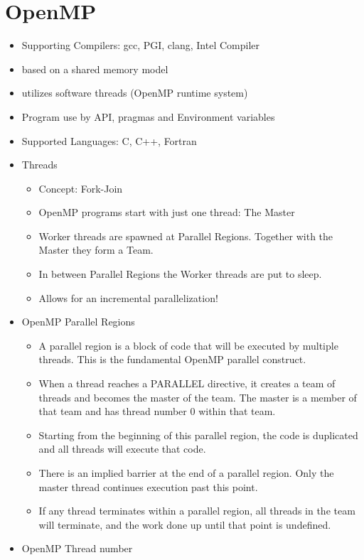 \documentclass[paper=a4, fontsize=11pt]{scrartcl} %
\numberwithin{equation}{section} %
\numberwithin{figure}{section} %
\numberwithin{table}{section} %
\begin{document}
\section{OpenMP}

\begin{itemize}
  \item Supporting Compilers: gcc, PGI, clang, Intel Compiler
  \item based on a shared memory model
  \item utilizes software threads (OpenMP runtime system)
  \item Program use by API, pragmas and Environment variables
  \item Supported Languages: C, C++, Fortran
  \item Threads
  \begin{itemize}
    \item Concept: Fork-Join
    \item OpenMP programs start with just one thread: The Master
    \item Worker threads are spawned at Parallel Regions. Together with the Master they form a Team.
    \item In between Parallel Regions the Worker threads are put to sleep.
    \item Allows for an incremental parallelization!
  \end{itemize}
  \item OpenMP Parallel Regions
  \begin{itemize}
    \item A parallel region is a block of code that will be executed by multiple threads. This is the fundamental OpenMP parallel construct.
    \item When a thread reaches a PARALLEL directive, it creates a team of threads and becomes the master of the team. The master is a member of that team and has thread number 0 within that team.
    \item Starting from the beginning of this parallel region, the code is duplicated and all threads will execute that code.
    \item There is an implied barrier at the end of a parallel region. Only the master thread continues execution past this point.
    \item If any thread terminates within a parallel region, all threads in the team will terminate, and the work done up until that point is undefined.
  \end{itemize}
  \item OpenMP Thread number

\end{itemize}
\end{document}

